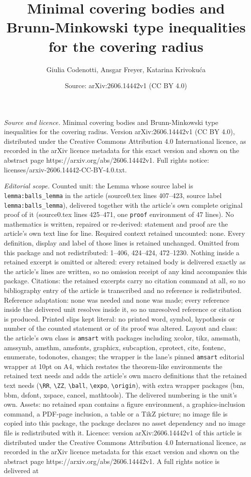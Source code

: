 \documentclass[10pt,a4paper]{amsart}
\title[Minimal covering bodies and Brunn-Minkowski type inequalitie]{Minimal covering bodies and Brunn-Minkowski type inequalities for the covering radius}
\author{Giulia Codenotti, Ansgar Freyer, Katarina Krivoku\'ca}
\date{Source: arXiv:2606.14442v1 (CC BY 4.0)}
\begin{document}
\maketitle

\noindent\emph{Source and licence.} Minimal covering bodies and Brunn-Minkowski type inequalities for the covering radius. Version arXiv:2606.14442v1 (CC BY 4.0), distributed under the Creative Commons Attribution 4.0 International licence, as recorded in the arXiv licence metadata for this exact version and shown on the abstract page https://arxiv.org/abs/2606.14442v1. Full rights notice: licenses/arxiv-2606.14442-CC-BY-4.0.txt.\par\smallskip

\noindent\textit{Editorial scope.} Counted unit: the Lemma whose source label is \texttt{lemma:balls\_lemma} in the article (source0.tex lines 407--423, source label \texttt{lemma:balls\_lemma}), delivered together with the article's own complete original proof of it (source0.tex lines 425--471, one \texttt{proof} environment of 47 lines). No mathematics is written, repaired or re-derived: statement and proof are the article's own text line for line. Required context retained uncounted: none. Every definition, display and label of those lines is retained unchanged. Omitted from this package and not redistributed: 1--406, 424--424, 472--1230. Nothing inside a retained excerpt is omitted or altered: every retained body is delivered exactly as the article's lines are written, so no omission receipt of any kind accompanies this package. Citations: the retained excerpts carry no citation command at all, so no bibliography entry of the article is transcribed and no reference is redistributed. Reference adaptation: none was needed and none was made; every reference inside the delivered unit resolves inside it, so no unresolved reference or citation is produced. Printed slips kept literal: no printed word, symbol, hypothesis or number of the counted statement or of its proof was altered. Layout and class: the article's own class is \texttt{amsart} with packages including xcolor, tikz, amsmath, amssymb, amsthm, amsfonts, graphicx, subcaption, cprotect, cite, fontenc, enumerate, todonotes, changes; the wrapper is the lane's pinned \texttt{amsart} editorial wrapper at 10pt on A4, which restates the theorem-like environments the retained text needs and adds the article's own macro definitions that the retained text needs (\texttt{\textbackslash RR}, \texttt{\textbackslash ZZ}, \texttt{\textbackslash ball}, \texttt{\textbackslash expo}, \texttt{\textbackslash origin}), with extra wrapper packages (bm, bbm, dsfont, xspace, cancel, mathtools). The delivered numbering is the unit's own. Assets: no retained span contains a figure environment, a graphics-inclusion command, a PDF-page inclusion, a table or a TikZ picture; no image file is copied into this package, the package declares no asset dependency and no image file is redistributed with it. Licence: version arXiv:2606.14442v1 of this article is distributed under the Creative Commons Attribution 4.0 International licence, as recorded in the arXiv licence metadata for this exact version and shown on the abstract page https://arxiv.org/abs/2606.14442v1. A full rights notice is delivered at 
\end{document}

